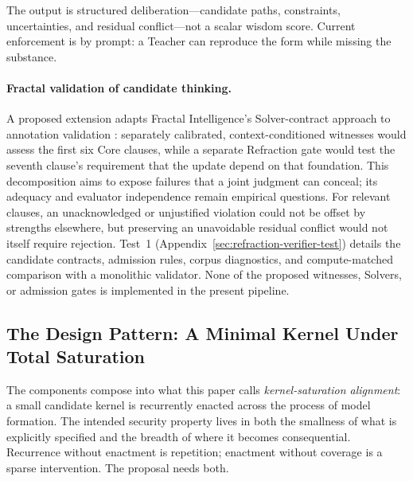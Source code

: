 \documentclass[11pt]{article}
\begin{document}
The output is structured deliberation---candidate paths, constraints,
uncertainties, and residual conflict---not a scalar wisdom score. Current enforcement is by prompt: a Teacher can reproduce the form
while missing the substance.

\paragraph{Fractal validation of candidate thinking.}\label{sec:fractal-validation}
A proposed extension adapts Fractal Intelligence's Solver-contract approach
to annotation validation \cite{westerberg2026fractal}: separately calibrated,
context-conditioned witnesses would assess the first six Core clauses, while
a separate Refraction gate would test the seventh clause's requirement that
the update depend on that foundation. This decomposition aims to expose
failures that a joint judgment can conceal; its adequacy and evaluator
independence remain empirical questions. For relevant clauses, an
unacknowledged or unjustified violation could not be offset by strengths
elsewhere, but preserving an unavoidable residual conflict would not itself
require rejection. Test~1 (Appendix~\ref{sec:refraction-verifier-test}) details
the candidate contracts, admission rules, corpus diagnostics, and
compute-matched comparison with a monolithic validator. None of the proposed
witnesses, Solvers, or admission gates is implemented in the present pipeline.

\subsection{The Design Pattern: A Minimal Kernel Under Total Saturation}\label{sec:kernel-saturation}

The components compose into what this paper calls \emph{kernel-saturation
alignment}: a small candidate kernel is recurrently enacted across the process
of model formation. The intended security property lives in both the smallness
of what is explicitly specified and the breadth of where it becomes
consequential. Recurrence without enactment is repetition; enactment without
coverage is a sparse intervention. The proposal needs both.
\end{document}

